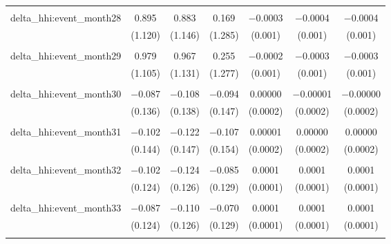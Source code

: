 \begin{table}[H]
{\begin{tabular}{@{\extracolsep{5pt}}lcccccc}
   & & & & & & \\  

  delta\_hhi:event\_month28 & 0.895 & 0.883 & 0.169 & $-$0.0003 & $-$0.0004 & $-$0.0004 \\  

   & (1.120) & (1.146) & (1.285) & (0.001) & (0.001) & (0.001) \\  

   & & & & & & \\  

  delta\_hhi:event\_month29 & 0.979 & 0.967 & 0.255 & $-$0.0002 & $-$0.0003 & $-$0.0003 \\  

   & (1.105) & (1.131) & (1.277) & (0.001) & (0.001) & (0.001) \\  

   & & & & & & \\  

  delta\_hhi:event\_month30 & $-$0.087 & $-$0.108 & $-$0.094 & 0.00000 & $-$0.00001 & $-$0.00000 \\  

   & (0.136) & (0.138) & (0.147) & (0.0002) & (0.0002) & (0.0002) \\  

   & & & & & & \\  

  delta\_hhi:event\_month31 & $-$0.102 & $-$0.122 & $-$0.107 & 0.00001 & 0.00000 & 0.00000 \\  

   & (0.144) & (0.147) & (0.154) & (0.0002) & (0.0002) & (0.0002) \\  

   & & & & & & \\  

  delta\_hhi:event\_month32 & $-$0.102 & $-$0.124 & $-$0.085 & 0.0001 & 0.0001 & 0.0001 \\  

   & (0.124) & (0.126) & (0.129) & (0.0001) & (0.0001) & (0.0001) \\  

   & & & & & & \\  

  delta\_hhi:event\_month33 & $-$0.087 & $-$0.110 & $-$0.070 & 0.0001 & 0.0001 & 0.0001 \\  

   & (0.124) & (0.126) & (0.129) & (0.0001) & (0.0001) & (0.0001) \\  

   & & & & & & \\  


\end{tabular}}
\end{table}
